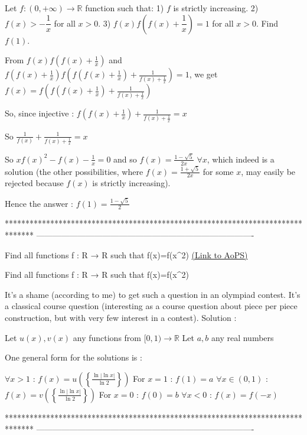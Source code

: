 \begin{solution}
	\begin{tcolorbox}Let $f:(0,+\infty)\rightarrow\mathbb{R}$ function such that:
1) $f$ is strictly increasing.
2) $f(x)>-\dfrac{1}{x}$ for all $x>0$.
3) $f(x)f(f(x)+\dfrac{1}{x})=1$ for all $x>0$.
Find $f(1)$.\end{tcolorbox}
From $f(x)f(f(x)+\frac 1x)$ and $f(f(x)+\frac 1x)f(f(f(x)+\frac 1x)+\frac 1{f(x)+\frac 1x})=1$, we get $f(x)=f(f(f(x)+\frac 1x)+\frac 1{f(x)+\frac 1x})$

So, since injective : $f(f(x)+\frac 1x)+\frac 1{f(x)+\frac 1x}=x$

So $\frac 1{f(x)}+\frac 1{f(x)+\frac 1x}=x$

So $xf(x)^2-f(x)-\frac 1x=0$ and so $f(x)=\frac{1-\sqrt 5}{2x}$ $\forall x$, which indeed is a solution (the other possibilities, where $f(x)=\frac{1+\sqrt 5}{2x}$ for some $x$, may easily be rejected because $f(x)$ is strictly increasing).

Hence the answer : $\boxed{f(1)=\frac{1-\sqrt 5}2}$
\end{solution}
*******************************************************************************
-------------------------------------------------------------------------------

\begin{problem}
	Find all functions f : R → R such that  f(x)=f(x^2)
	\flushright \href{https://artofproblemsolving.com/community/c6h571482}{(Link to AoPS)}
\end{problem}



\begin{solution}
	\begin{tcolorbox}Find all functions f : R → R such that  f(x)=f(x^2)\end{tcolorbox}
It's a shame (according to me) to get such a question in an olympiad contest. It's a classical course question (interesting as a course question about piece per piece construction, but with very few interest in a contest).
Solution :

Let $u(x),v(x)$ any functions from $[0,1)\to\mathbb R$
Let $a,b$ any real numbers

One general form for the solutions is :

$\forall x>1$ : $f(x)=u\left(\left\{\frac{\ln |\ln x|}{\ln 2}\right\}\right)$
For $x=1$ : $f(1)=a$
$\forall x\in (0,1)$ :  $f(x)=v\left(\left\{\frac{\ln |\ln x|}{\ln 2}\right\}\right)$
For $x=0$ : $f(0)=b$
$\forall x<0$ : $f(x)=f(-x)$
\end{solution}
*******************************************************************************
-------------------------------------------------------------------------------

